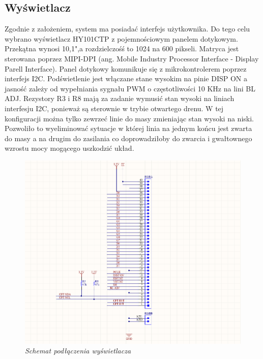 \documentclass[eng,printmode]{mgr}
\begin{document}
\subsection*{Wyświetlacz}
Zgodnie z założeniem, system ma posiadać interfejs  użytkownika. Do tego celu wybrano wyświetlacz HY101CTP z pojemnościowym panelem dotykowym. Przekątna wynosi 10,1",a rozdzielczośś to 1024 na 600 pikseli. Matryca jest sterowana poprzez MIPI-DPI (ang. Mobile Industry Processor Interface - Display Parell Interface). Panel dotykowy komunikuje się z mikrokontrolerem poprzez interfejs I2C. Podświetlenie jest włączane stane wysokim na pinie DISP ON a jasność zależy od wypełniania sygnału PWM o częstotliwości 10 KHz na lini BL ADJ.
Rezystory R3 i R8 mają za zadanie wymusić stan wysoki na liniach interfesju I2C, ponieważ są sterownie w trybie otwartego drenu. W tej konfiguracji można tylko zewrzeć linie do masy zmieniając stan wysoki na niski. Pozwoliło to wyeliminować sytuacje w której linia na jednym końcu jest zwarta do masy a na drugim do zasilania co doprowadziłoby do zwarcia i gwałtownego wzrostu mocy mogącego uszkodzić układ.
\begin{figure}[!h]
    \centering
    \includegraphics[width=\textwidth]{schematics/display.png}
    \caption{\textit{ Schemat podłączenia wyświetlacza}}
\end{figure}
\end{document}

